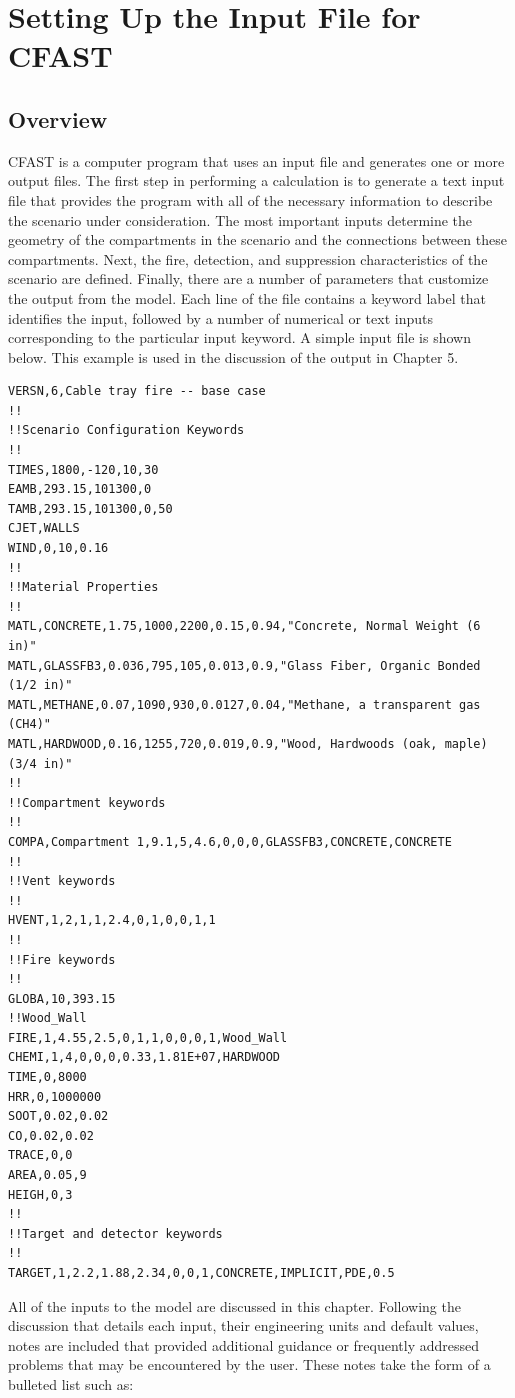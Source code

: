 \chapter{Setting Up the Input File for CFAST}

\section{Overview}

CFAST is a computer program that uses an input file and generates one or more output files. The first step in performing a calculation is to generate a text input file that provides the program with all of the necessary information to describe the scenario under consideration.  The most important inputs determine the geometry of the compartments in the scenario and the connections between these compartments. Next, the fire, detection, and suppression characteristics of the scenario are defined. Finally, there are a number of parameters that customize the output from the model.  Each line of the file contains a keyword label that identifies the input, followed by a number of numerical or text inputs corresponding to the particular input keyword. A simple input file is shown below. This example is used in the discussion of the output in Chapter 5.

\begin{lstlisting}
VERSN,6,Cable tray fire -- base case
!!
!!Scenario Configuration Keywords
!!
TIMES,1800,-120,10,30
EAMB,293.15,101300,0
TAMB,293.15,101300,0,50
CJET,WALLS
WIND,0,10,0.16
!!
!!Material Properties
!!
MATL,CONCRETE,1.75,1000,2200,0.15,0.94,"Concrete, Normal Weight (6 in)"
MATL,GLASSFB3,0.036,795,105,0.013,0.9,"Glass Fiber, Organic Bonded (1/2 in)"
MATL,METHANE,0.07,1090,930,0.0127,0.04,"Methane, a transparent gas (CH4)"
MATL,HARDWOOD,0.16,1255,720,0.019,0.9,"Wood, Hardwoods (oak, maple) (3/4 in)"
!!
!!Compartment keywords
!!
COMPA,Compartment 1,9.1,5,4.6,0,0,0,GLASSFB3,CONCRETE,CONCRETE
!!
!!Vent keywords
!!
HVENT,1,2,1,1,2.4,0,1,0,0,1,1
!!
!!Fire keywords
!!
GLOBA,10,393.15
!!Wood_Wall
FIRE,1,4.55,2.5,0,1,1,0,0,0,1,Wood_Wall
CHEMI,1,4,0,0,0,0.33,1.81E+07,HARDWOOD
TIME,0,8000
HRR,0,1000000
SOOT,0.02,0.02
CO,0.02,0.02
TRACE,0,0
AREA,0.05,9
HEIGH,0,3
!!
!!Target and detector keywords
!!
TARGET,1,2.2,1.88,2.34,0,0,1,CONCRETE,IMPLICIT,PDE,0.5
\end{lstlisting}

All of the inputs to the model are discussed in this chapter.  Following the discussion that details each input, their engineering units and default values, notes are included that provided additional guidance or frequently addressed problems that may be encountered by the user. These notes take the form of a bulleted list such as:

